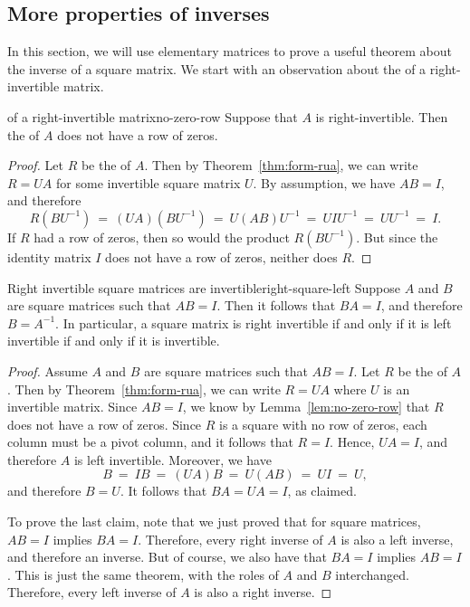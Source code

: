 \subsection{More properties of inverses}


In this section, we will use elementary matrices to prove a useful
theorem about the inverse of a square matrix. We start with an
observation about the {\ef} of a right-invertible matrix.

\begin{lemma}{{\Ef} of a right-invertible matrix}{no-zero-row}
  Suppose that $A$ is right-invertible. Then the {\rref} of $A$ does
  not have a row of zeros.
\end{lemma}

\begin{proof}
  Let $R$ be the {\rref} of $A$. Then by Theorem~\ref{thm:form-rua},
  we can write $R=UA$ for some invertible square matrix $U$. By
  assumption, we have $AB=I$, and therefore
  \begin{equation*}
    R(BU^{-1})
    ~=~
    (UA)(BU^{-1})
    ~=~
    U(AB)U^{-1}
    ~=~
    UIU^{-1}
    ~=~
    UU^{-1}
    ~=~
    I.
  \end{equation*}
  If $R$ had a row of zeros, then so would the product
  $R(BU^{-1})$. But since the identity matrix $I$ does not have a row
  of zeros, neither does $R$.
\end{proof}

\begin{theorem}{Right invertible square matrices are invertible}{right-square-left}
  Suppose $A$ and $B$ are square matrices such that $AB=I$. Then it
  follows that $BA=I$, and therefore $B=A^{-1}$. In particular, a
  square matrix is right invertible if and only if it is left
  invertible if and only if it is invertible.
\end{theorem}

\begin{proof}
  Assume $A$ and $B$ are square matrices such that $AB=I$. Let $R$ be
  the {\rref} of $A$. Then by Theorem~\ref{thm:form-rua}, we can write
  $R=UA$ where $U$ is an invertible matrix. Since $AB=I$, we know by
  Lemma~\ref{lem:no-zero-row} that $R$ does not have a row of
  zeros. Since $R$ is a square {\rref} with no row of zeros, each
  column must be a pivot column, and it follows that $R=I$. Hence,
  $UA=I$, and therefore $A$ is left invertible. Moreover, we have
  \begin{equation*}
    B ~=~ IB ~=~ (UA)B ~=~ U(AB) ~=~ UI ~=~ U,
  \end{equation*}
  and therefore $B=U$. It follows that $BA=UA=I$, as claimed.

  To prove the last claim, note that we just proved that for square
  matrices, $AB=I$ implies $BA=I$. Therefore, every right inverse of
  $A$ is also a left inverse, and therefore an inverse. But of course,
  we also have that $BA=I$ implies $AB=I$. This is just the same
  theorem, with the roles of $A$ and $B$ interchanged. Therefore,
  every left inverse of $A$ is also a right inverse.
\end{proof}

